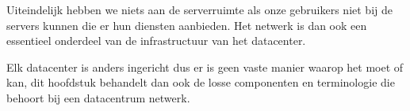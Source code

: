 Uiteindelijk hebben we niets aan de serverruimte als onze gebruikers niet bij de servers kunnen die er hun diensten aanbieden. Het netwerk is dan ook een essentieel onderdeel van de infrastructuur van het datacenter.

Elk datacenter is anders ingericht dus er is geen vaste manier waarop het moet of kan, dit hoofdstuk behandelt dan ook de losse componenten en terminologie die behoort bij een datacentrum netwerk.
